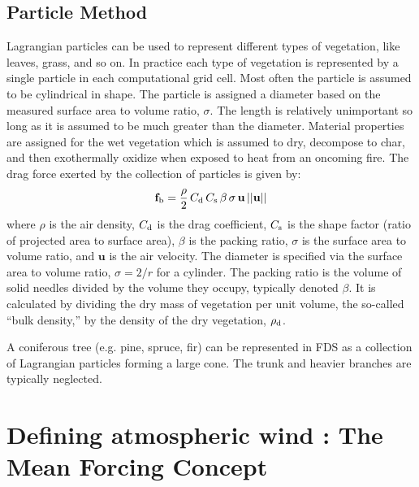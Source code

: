 \documentclass[journal,article,atmosphere,submit,moreauthors,pdftex]{Definitions/mdpi}
\begin{document}
\subsection{Particle Method}

Lagrangian particles can be used to represent different types of vegetation, like leaves, grass, and so on. In practice each type of vegetation is represented by a single particle in each computational grid cell. Most often the particle is assumed to be cylindrical in shape. The particle is assigned a diameter based on the measured surface area to volume ratio, $\sigma$. The length is relatively unimportant so long as it is assumed to be much greater than the diameter. Material properties are assigned for the wet vegetation which is assumed to dry, decompose to char, and then exothermally oxidize when exposed to heat from an oncoming fire. The drag force exerted by the collection of particles is given by:
\begin{equation}
   \mathbf{f}_{\rm b} = \frac{\rho}{2} \, C_{\rm d} \, C_{\rm s} \, \beta \, \sigma \, \mathbf{u} \, ||\mathbf{u}||
\end{equation}
where $\rho$ is the air density, $C_{\rm d}$ is the drag coefficient, $C_{\rm s}$ is the shape factor (ratio of projected area to surface area), $\beta$ is the packing ratio, $\sigma$ is the surface area to volume ratio, and $\mathbf{u}$ is the air velocity. The diameter is specified via the surface area to volume ratio, $\sigma=2/r$ for a cylinder. The packing ratio is the volume of solid needles divided by the volume they occupy, typically denoted $\beta$. It is calculated by dividing the dry mass of vegetation per unit volume, the so-called ``bulk density,'' by the density of the dry vegetation, $\rho_{\rm d}$.

A coniferous tree (e.g. pine, spruce, fir) can be represented in FDS as a collection of Lagrangian particles forming a large cone. The trunk and heavier branches are typically neglected.









\section{Defining atmospheric wind : The Mean Forcing Concept} \label{sec:wind}
\end{document}
